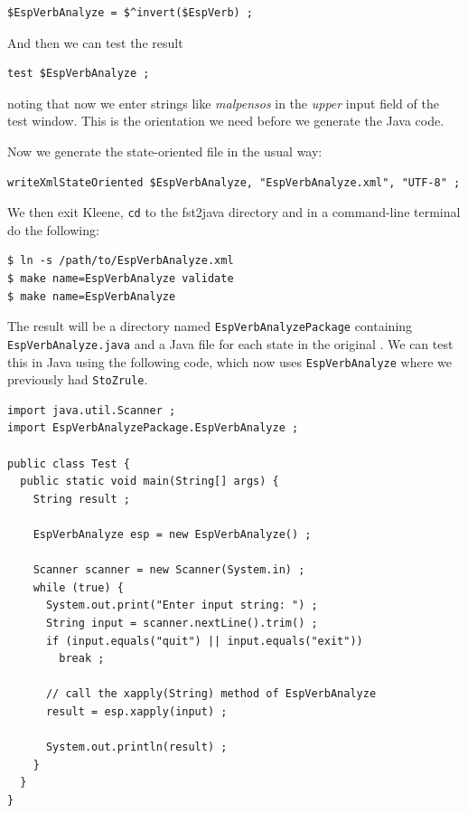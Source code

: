 \begin{Verbatim}
$EspVerbAnalyze = $^invert($EspVerb) ;
\end{Verbatim}

\noindent
And then we can test the result

\begin{Verbatim}
test $EspVerbAnalyze ;
\end{Verbatim}

\noindent
noting that now we enter strings like \emph{malpensos} in the \emph{upper} input field of the
test window.  This is the orientation we need before we generate the Java code.

Now we generate the state-oriented  file in the usual way:

\begin{Verbatim}
writeXmlStateOriented $EspVerbAnalyze, "EspVerbAnalyze.xml", "UTF-8" ;
\end{Verbatim}

\noindent
We then exit Kleene, \texttt{cd} to the fst2java directory and in a command-line terminal do the
following:

\begin{Verbatim}
$ ln -s /path/to/EspVerbAnalyze.xml
$ make name=EspVerbAnalyze validate
$ make name=EspVerbAnalyze
\end{Verbatim}

\noindent
The result will be a directory named \texttt{EspVerbAnalyzePackage} containing
\texttt{EspVerbAnalyze.java} and a Java file for each state in the original \fsm{}.  
We can test this in
Java using the following code, which now uses \texttt{EspVerbAnalyze} where we previously had
\texttt{StoZrule}.

\begin{Verbatim}
import java.util.Scanner ;
import EspVerbAnalyzePackage.EspVerbAnalyze ;

public class Test {
  public static void main(String[] args) {
    String result ;

    EspVerbAnalyze esp = new EspVerbAnalyze() ;

    Scanner scanner = new Scanner(System.in) ;
    while (true) {
      System.out.print("Enter input string: ") ;
      String input = scanner.nextLine().trim() ;
      if (input.equals("quit") || input.equals("exit"))
        break ;

      // call the xapply(String) method of EspVerbAnalyze
      result = esp.xapply(input) ;

      System.out.println(result) ;
    }
  }
}
\end{Verbatim}

